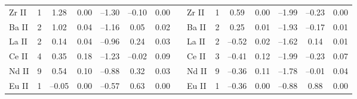 \documentclass{emulateapj}
\begin{document}
\begin{longtable*}{lccccccclcccccc}
 Zr \textsc{II} &   1 &    1.28 &    0.00 &  --1.30 &  --0.10 &    0.00 &&
 Zr \textsc{II} &   1 &    0.59 &    0.00 &  --1.99 &  --0.23 &    0.00 \\
 Ba \textsc{II} &   2 &    1.02 &    0.04 &  --1.16 &    0.05 &    0.02 &&
 Ba \textsc{II} &   2 &    0.25 &    0.01 &  --1.93 &  --0.17 &    0.01 \\
 La \textsc{II} &   2 &    0.14 &    0.04 &  --0.96 &    0.24 &    0.03 &&
 La \textsc{II} &   2 &  --0.52 &    0.02 &  --1.62 &    0.14 &    0.01 \\
 Ce \textsc{II} &   4 &    0.35 &    0.18 &  --1.23 &  --0.02 &    0.09 &&
 Ce \textsc{II} &   3 &  --0.41 &    0.12 &  --1.99 &  --0.23 &    0.07 \\
 Nd \textsc{II} &   9 &    0.54 &    0.10 &  --0.88 &    0.32 &    0.03 &&
 Nd \textsc{II} &   9 &  --0.36 &    0.11 &  --1.78 &  --0.01 &    0.04 \\
 Eu \textsc{II} &   1 &  --0.05 &    0.00 &  --0.57 &    0.63 &    0.00 &&
 Eu \textsc{II} &   1 &  --0.36 &    0.00 &  --0.88 &    0.88 &    0.00 \\


\end{longtable*}
\end{document}
